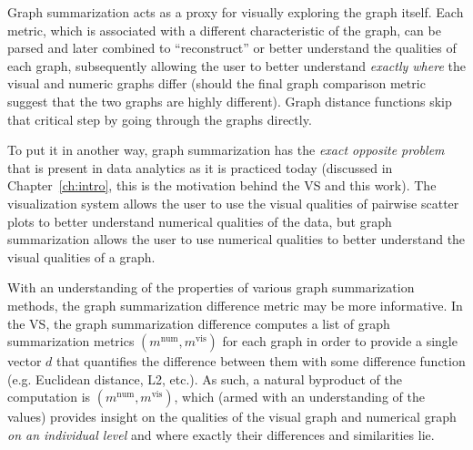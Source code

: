 Graph summarization acts as a proxy for visually exploring the graph 
itself. Each metric, which is associated with a different characteristic of the 
graph, can be parsed and later combined to 
``reconstruct'' or better understand the qualities of each graph, subsequently 
allowing the user to better understand \textit{exactly where} the visual and 
numeric graphs differ (should the final graph comparison metric suggest that 
the two graphs are highly different). Graph distance functions skip that 
critical step by going through 
the graphs directly.

To put it in another way, graph summarization has the \textit{exact opposite 
problem} that is present in data analytics as it is practiced today (discussed 
in Chapter~\ref{ch:intro}, this is the motivation behind the VS and this work). 
The visualization system allows the user to use the visual qualities of pairwise
scatter plots to better understand numerical qualities of the data, but graph 
summarization allows the user to use numerical qualities to better understand 
the visual qualities of a graph. 

With an understanding of the properties of various graph summarization methods, 
the graph summarization difference metric may be more informative. In the VS, 
the graph summarization difference computes a list of graph summarization 
metrics $(m^\text{num},m^\text{vis})$ for each graph in order to provide a 
single vector $d$ that quantifies the difference between them with 
some difference function (e.g. Euclidean distance, L2, etc.). 
As such, a natural byproduct of the computation is 
$(m^\text{num},m^\text{vis})$, which (armed 
with an understanding of the values) provides insight on the qualities of the 
visual graph and numerical graph \textit{on an individual level} and where 
exactly their differences and similarities lie.
